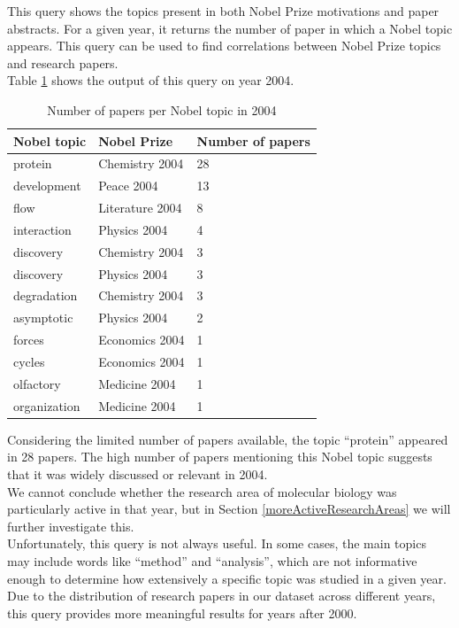 \documentclass{article}
\begin{document}
This query shows the topics present in both Nobel Prize motivations and paper abstracts.
For a given year, it returns the number of paper in which a Nobel topic appears.
This query can be used to find correlations between Nobel Prize topics and research
papers.\\
Table \ref{tab:papersNobelTopicsYear} shows the output of this query on year 2004.

\begin{table}[H]
	\caption{Number of papers per Nobel topic in 2004}
	\centering
	\begin{tabular}{|l|l|l|}
		\hline
		\textbf{Nobel topic} & \textbf{Nobel Prize} & \textbf{Number of papers} \\ \hline
		protein              & Chemistry 2004       & 28                        \\ \hline
		development          & Peace 2004           & 13                        \\ \hline
		flow                 & Literature 2004      & 8                         \\ \hline
		interaction          & Physics 2004         & 4                         \\ \hline
		discovery            & Chemistry 2004       & 3                         \\ \hline
		discovery            & Physics 2004         & 3                         \\ \hline
		degradation          & Chemistry 2004       & 3                         \\ \hline
		asymptotic           & Physics 2004         & 2                         \\ \hline
		forces               & Economics 2004       & 1                         \\ \hline
		cycles               & Economics 2004       & 1                         \\ \hline
		olfactory            & Medicine 2004        & 1                         \\ \hline
		organization         & Medicine 2004        & 1                         \\ \hline
	\end{tabular}
	\label{tab:papersNobelTopicsYear}
\end{table}

Considering the limited number of papers available, the topic ``protein'' appeared
in 28 papers. The high number of papers mentioning this Nobel topic suggests that
it was widely discussed or relevant in 2004.\\
We cannot conclude whether the research area of molecular biology was particularly active
in that year, but in Section \ref{moreActiveResearchAreas} we will further
investigate this.\\
Unfortunately, this query is not always useful. In some cases, the
main topics may include words like ``method'' and ``analysis'', which are not
informative enough to determine how extensively a specific topic was studied
in a given year.\\
Due to the distribution of research papers in our dataset across different years,
this query provides more meaningful results for years after 2000.
\end{document}
